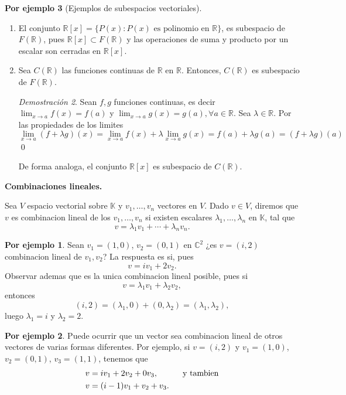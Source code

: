 \documentclass{article}
\theoremstyle{definition}
\theoremstyle{definition}
\newtheorem*{ej}{Por ejemplo}
\theoremstyle{remark}
\newtheorem*{demo}{Demostración}
\begin{document}
\begin{ej}[Ejemplos de subespacios vectoriales]
\begin{enumerate}[label=\arabic*. , start=4]
\begin{demo}
      Luego $A+\lambda B \in Sim_{n}(\mathbb{K})$. \\ \qed
    \end{demo}
  \item El conjunto $\mathbb{R}[x]=\{P(x):P(x) \text{ es polinomio en }\mathbb{R}\}$, es subespacio de $F(\mathbb{R})$, pues $\mathbb{R}[x] \subset F(\mathbb{R})$ y las operaciones de suma y producto por un escalar son cerradas en $\mathbb{R}[x]$.
  \item Sea $C(\mathbb{R})$ las funciones continuas de $\mathbb{R}$ en $\mathbb{R}$. Entonces, $C(\mathbb{R})$ es subespacio de $F(\mathbb{R})$. \begin{demo}
      Sean $f,g$ funciones continuas, es decir $\lim_{x \to a}f(x)=f(a)$ y $\lim_{x \to a}g(x)=g(a), \forall a \in \mathbb{R}$. Sea $\lambda \in \mathbb{R}$. Por las propiedades de los limites \[
        \lim_{x \to a}(f+\lambda g)(x)=\lim_{x \to a } f(x)+ \lambda \lim_{ x \to a }g(x) = f(a)+\lambda g(a)=(f+\lambda g)(a)
      \] \qed
  \end{demo}
  De forma analoga, el conjunto $\mathbb{R}[x]$ es subespacio de $C(\mathbb{R})$.
\end{enumerate}
\begin{center}
\textbf{Combinaciones lineales.}
\end{center}
\begin{defi}
  Sea $V$ espacio vectorial sobre $\mathbb{K}$ y $v_1, \dots,v_n$ vectores en $V$. Dado $v \in V$, diremos que $v$ es combinacion lineal de los $v_1, \dots, v_n$ si existen escalares $\lambda _1 , \dots ,\lambda_n$ en $\mathbb{K}$, tal que \[
v=\lambda_1 v_1 + \cdots + \lambda_n v_n.
  \]
\end{defi}

\begin{ej}
  Sean $v_1 = (1,0)$, $v_2=(0,1)$ en $\mathbb{C}^2$ ¿es $v=(i,2)$ combinacion lineal de $v_1,v_2$? La respuesta es si, pues \[
v=iv_1+2v_2.
  \]
  Observar ademas que es la unica combinacion lineal posible, pues si \[
v=\lambda_1 v_1 + \lambda_2 v_2 , 
  \]
  entonces \[
    (i,2)=(\lambda_1, 0)+(0, \lambda_2)=(\lambda_1, \lambda_2),
  \]luego $\lambda_1=i$ y $\lambda_2=2$.
\end{ej}

\begin{ej}
 Puede ocurrir que un vector sea combinacion lineal de otros vectores de varias formas diferentes. Por ejemplo, si $v=(i,2)$ y $v_1=(1,0)$, $v_2=(0,1)$, $v_3=(1,1)$, tenemos que 
 \begin{align}
   v &= iv_1 + 2v_2 + 0 v_3 , \quad\quad\quad \text{y tambien}  \notag \\
   v &= (i-1)v_1 + v_2 + v_3 . \notag
 \end{align}
\end{ej}


\end{ej}
\end{document}
